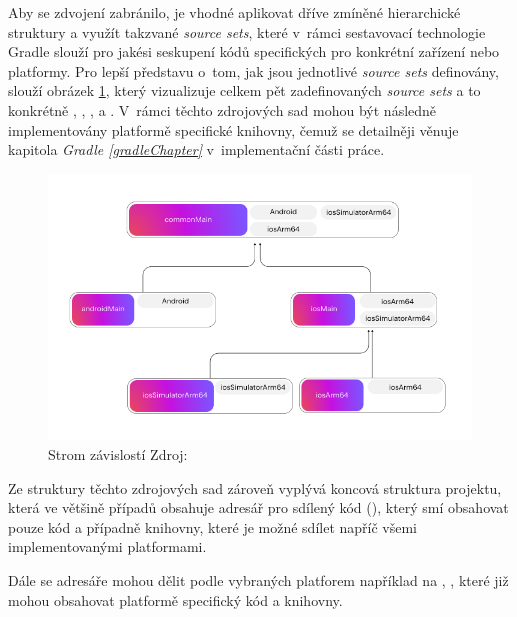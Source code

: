 Aby se zdvojení zabránilo, je vhodné aplikovat dříve zmíněné hierarchické struktury a využít takzvané \textit{source sets}, které v~rámci sestavovací technologie Gradle slouží 
pro jakési seskupení kódů specifických pro konkrétní zařízení nebo platformy. Pro lepší představu o~tom, jak jsou jednotlivé
\textit{source sets} definovány, slouží obrázek \ref{fig:dependson-tree-diagram},
který vizualizuje celkem pět zadefinovaných \textit{source sets} a to konkrétně , , 
,  a . V~rámci těchto zdrojových sad mohou být následně implementovány
platformě specifické knihovny, čemuž se detailněji věnuje kapitola \textit{Gradle \ref{gradleChapter}} v~implementační části práce.


\begin{figure}[H]
  \centering
  \includegraphics[width=.9\textwidth]{dependson-tree-diagram.png}
  \caption{Strom závislostí Zdroj: \cite{imgStromZavislosti}}
  \label{fig:dependson-tree-diagram}
\end{figure}

Ze struktury těchto zdrojových sad zároveň vyplývá koncová struktura projektu, která ve většině případů obsahuje adresář pro sdílený kód (), 
který smí obsahovat pouze kód a případně knihovny, které je možné sdílet napříč všemi implementovanými platformami.

Dále se adresáře mohou dělit podle vybraných platforem například na , , které již mohou obsahovat platformě specifický kód a knihovny.

